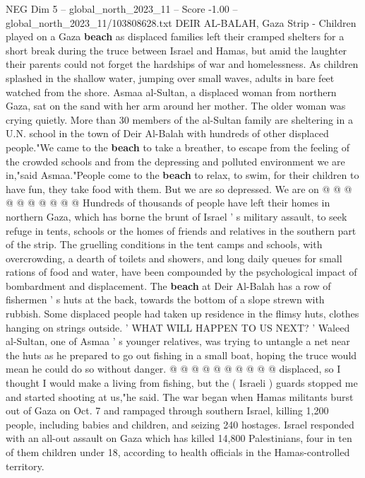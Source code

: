\begin{textsample}{NEG Dim 5 – global\_north\_2023\_11 – Score -1.00 – global\_north\_2023\_11/103808628.txt}  \label{ex:f5_neg_045}
DEIR AL-BALAH, Gaza Strip - Children played on a Gaza \textbf{beach} as displaced families left their cramped shelters for a short break during the truce between Israel and Hamas, but amid the laughter their parents could not forget the hardships of war and homelessness.
As children splashed in the shallow water, jumping over small waves, adults in bare feet watched from the shore.
Asmaa al-Sultan, a displaced woman from northern Gaza, sat on the sand with her arm around her mother.
The older woman was crying quietly.
More than 30 members of the al-Sultan family are sheltering in a U.N. school in the town of Deir Al-Balah with hundreds of other displaced people."We came to the \textbf{beach} to take a breather, to escape from the feeling of the crowded schools and from the depressing and polluted environment we are in,"said Asmaa."People come to the \textbf{beach} to relax, to swim, for their children to have fun, they take food with them.
But we are so depressed.
We are on @ @ @ @ @ @ @ @ @ @ Hundreds of thousands of people have left their homes in northern Gaza, which has borne the brunt of Israel ' s military assault, to seek refuge in tents, schools or the homes of friends and relatives in the southern part of the strip.
The gruelling conditions in the tent camps and schools, with overcrowding, a dearth of toilets and showers, and long daily queues for small rations of food and water, have been compounded by the psychological impact of bombardment and displacement.
The \textbf{beach} at Deir Al-Balah has a row of fishermen ' s huts at the back, towards the bottom of a slope strewn with rubbish.
Some displaced people had taken up residence in the flimsy huts, clothes hanging on strings outside. ' WHAT WILL HAPPEN TO US NEXT? ' Waleed al-Sultan, one of Asmaa ' s younger relatives, was trying to untangle a net near the huts as he prepared to go out fishing in a small boat, hoping the truce would mean he could do so without danger. @ @ @ @ @ @ @ @ @ @ displaced, so I thought I would make a living from fishing, but the ( Israeli ) guards stopped me and started shooting at us,"he said.
The war began when Hamas militants burst out of Gaza on Oct. 7 and rampaged through southern Israel, killing 1,200 people, including babies and children, and seizing 240 hostages.
Israel responded with an all-out assault on Gaza which has killed 14,800 Palestinians, four in ten of them children under 18, according to health officials in the Hamas-controlled territory.

\end{textsample}
